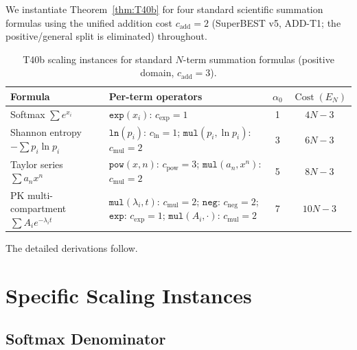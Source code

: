 \documentclass[12pt,a4paper]{article}
\theoremstyle{definition}
\newcommand{\Cost}{\operatorname{Cost}}
\begin{document}
We instantiate Theorem~\ref{thm:T40b} for four standard scientific
summation formulas using the unified addition cost $c_{\mathrm{add}} = 2$
(SuperBEST v5, ADD-T1; the positive/general split is eliminated)
throughout.

\begin{table}[h]
\centering
\caption{T40b scaling instances for standard $N$-term summation formulas
         (positive domain, $c_{\mathrm{add}} = 3$).}
\label{tab:scaling}
\smallskip
\begin{tabular}{@{}lp{4.8cm}cc@{}}
\toprule
\textbf{Formula} & \textbf{Per-term operators} &
  $\alpha_0$ & \textbf{$\Cost(E_N)$} \\
\midrule
Softmax $\sum e^{x_i}$
  & $\texttt{exp}(x_i)$: $c_{\exp}=1$
  & 1 & $4N - 3$ \\[6pt]
Shannon entropy $-\sum p_i \ln p_i$
  & $\texttt{ln}(p_i)$: $c_{\ln}=1$;\newline
    $\texttt{mul}(p_i, \ln p_i)$: $c_{\mathrm{mul}}=2$
  & 3 & $6N - 3$ \\[6pt]
Taylor series $\sum a_n x^n$
  & $\texttt{pow}(x,n)$: $c_{\mathrm{pow}}=3$;\newline
    $\texttt{mul}(a_n, x^n)$: $c_{\mathrm{mul}}=2$
  & 5 & $8N - 3$ \\[6pt]
PK multi-compartment $\sum A_i e^{-\lambda_i t}$
  & $\texttt{mul}(\lambda_i, t)$: $c_{\mathrm{mul}}=2$;\newline
    $\texttt{neg}$: $c_{\mathrm{neg}}=2$;\newline
    $\texttt{exp}$: $c_{\exp}=1$;\newline
    $\texttt{mul}(A_i, \cdot)$: $c_{\mathrm{mul}}=2$
  & 7 & $10N - 3$ \\
\bottomrule
\end{tabular}
\end{table}

The detailed derivations follow.

\section{Specific Scaling Instances}
\label{sec:instances}

\subsection{Softmax Denominator}
\end{document}
